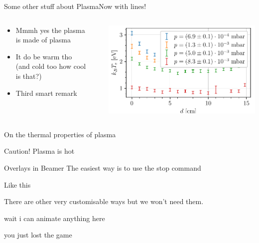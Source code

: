 \documentclass[10pt]{beamer}
\begin{document}
\begin{frame}{Some other stuff about Plasma}{Now with lines!}
    \begin{columns}
    \begin{column}{0.49\textwidth}
        \begin{itemize}
            \item Mmmh yes the plasma is made of plasma
            \item It do be warm tho (and cold too how cool is that?)
            \item Third smart remark
        \end{itemize}
    \end{column}
    \begin{column}{.02\textwidth}
        \rule{.1mm}{0.7\textheight}
    \end{column}
    \begin{column}{0.49\textwidth}
        \includegraphics[width=\textwidth]{../figures/temperatureeV_position.pdf}
    \end{column}
    \end{columns}
\end{frame}

\begin{frame}{On the thermal properties of plasma}
    \begin{block}{Caution!}
        Plasma is hot
    \end{block}
\end{frame}

\begin{frame}{Overlays in Beamer}
    The easiest way is to use the stop command
    \pause

    Like this
    \pause

    There are other very customisable ways but we won't need them.
    \pause

    wait i can animate anything here
    \pause

    you just lost the game
\end{frame}
\end{document}
